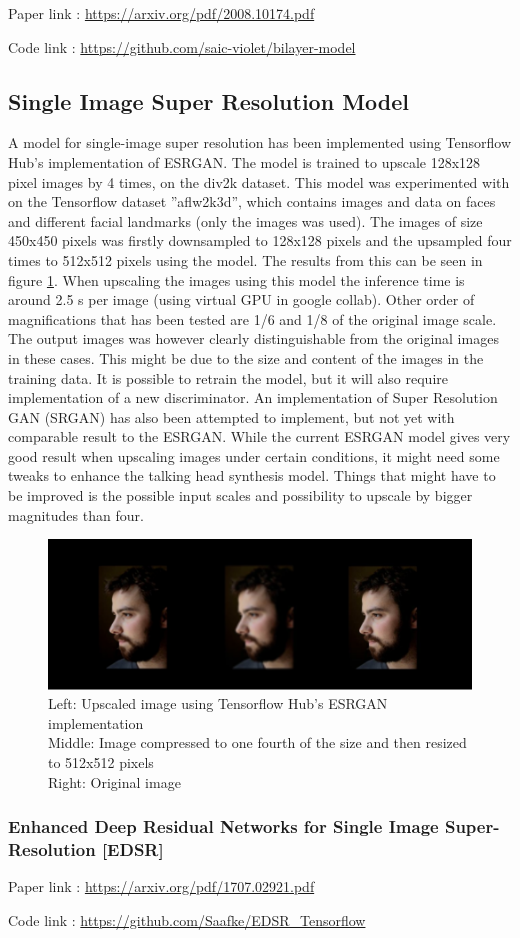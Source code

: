 \documentclass[twocolumn,10pt]{asme2ej}
\begin{document}
Paper link : \href{https://arxiv.org/pdf/2008.10174.pdf}{https://arxiv.org/pdf/2008.10174.pdf}

Code link : \href{https://github.com/saic-violet/bilayer-model}{https://github.com/saic-violet/bilayer-model}

\subsection{Single Image Super Resolution Model}
A model for single-image super resolution has been implemented using Tensorflow Hub's implementation of ESRGAN. The model is trained to upscale 128x128 pixel images by 4 times, on the div2k dataset. This model was experimented with on the Tensorflow dataset ''aflw2k3d'', which contains images and data on faces and different facial landmarks (only the images was used). The images of size 450x450 pixels was firstly downsampled to 128x128 pixels and the upsampled four times to 512x512 pixels using the model. The results from this can be seen in figure \ref{ESRGAN_comp}. When upscaling the images using this model the inference time is around 2.5 s per image (using virtual GPU in google collab). Other order of magnifications that has been tested are 1/6 and 1/8 of the original image scale. The output images was however clearly distinguishable from the original images in these cases. This might be due to the size and content of the images in the training data. It is possible to retrain the model, but it will also require implementation of a new discriminator. An implementation of Super Resolution GAN (SRGAN) has also been attempted to implement, but not yet with comparable result to the ESRGAN. While the current ESRGAN model gives very good result when upscaling images under certain conditions, it might need some tweaks to enhance the talking head synthesis model. Things that might have to be improved is the possible input scales and possibility to upscale by bigger magnitudes than four.

\begin{figure}[H]
    \centering
    \includegraphics[width=\textwidth/2]{ESRGAN_comparison.png}
    \caption{Left: Upscaled image using Tensorflow Hub's ESRGAN implementation\\
    Middle: Image compressed to one fourth of the size and then resized to 512x512 pixels\\
    Right: Original image}
    \label{ESRGAN_comp}
\end{figure}

\subsubsection{Enhanced Deep Residual Networks for Single Image Super-Resolution [EDSR]}

Paper link : \href{https://arxiv.org/pdf/1707.02921.pdf}{https://arxiv.org/pdf/1707.02921.pdf}

Code link : \href{https://github.com/Saafke/EDSR_Tensorflow}{https://github.com/Saafke/EDSR_Tensorflow}
\end{document}
